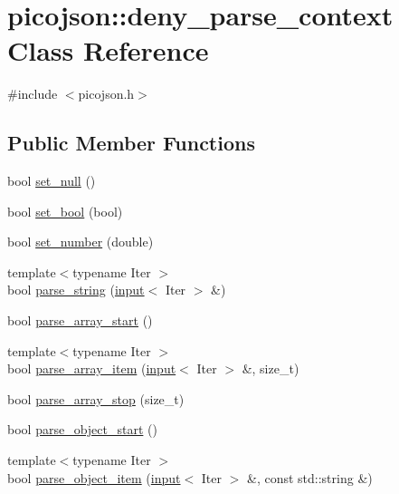 \hypertarget{classpicojson_1_1deny__parse__context}{}\section{picojson\+:\+:deny\+\_\+parse\+\_\+context Class Reference}
\label{classpicojson_1_1deny__parse__context}


{\ttfamily \#include $<$picojson.\+h$>$}

\subsection*{Public Member Functions}
\begin{DoxyCompactItemize}
\item 
bool \hyperlink{classpicojson_1_1deny__parse__context_abadde692be9f70942cb31799292c2ad9}{set\+\_\+null} ()
\item 
bool \hyperlink{classpicojson_1_1deny__parse__context_afc6a05e76120dd884da1ec4c8964f7b5}{set\+\_\+bool} (bool)
\item 
bool \hyperlink{classpicojson_1_1deny__parse__context_aec324fbb7fea546b6e0673724873e1e1}{set\+\_\+number} (double)
\item 
{\footnotesize template$<$typename Iter $>$ }\\bool \hyperlink{classpicojson_1_1deny__parse__context_a2000b3dcc1fb70a4c795e834f9d3122f}{parse\+\_\+string} (\hyperlink{classpicojson_1_1input}{input}$<$ Iter $>$ \&)
\item 
bool \hyperlink{classpicojson_1_1deny__parse__context_afbe65c8c2b2ada93595587432189d20f}{parse\+\_\+array\+\_\+start} ()
\item 
{\footnotesize template$<$typename Iter $>$ }\\bool \hyperlink{classpicojson_1_1deny__parse__context_ae15be8ad932ec02751870e962e9d34bf}{parse\+\_\+array\+\_\+item} (\hyperlink{classpicojson_1_1input}{input}$<$ Iter $>$ \&, size\+\_\+t)
\item 
bool \hyperlink{classpicojson_1_1deny__parse__context_ab284d5b0ee0e8df122d7e842a8d8e0b9}{parse\+\_\+array\+\_\+stop} (size\+\_\+t)
\item 
bool \hyperlink{classpicojson_1_1deny__parse__context_a344343a42dca7a25057e35077e517fbf}{parse\+\_\+object\+\_\+start} ()
\item 
{\footnotesize template$<$typename Iter $>$ }\\bool \hyperlink{classpicojson_1_1deny__parse__context_a08a8add290a938e71285f7b72a24b91c}{parse\+\_\+object\+\_\+item} (\hyperlink{classpicojson_1_1input}{input}$<$ Iter $>$ \&, const std\+::string \&)
\end{DoxyCompactItemize}


